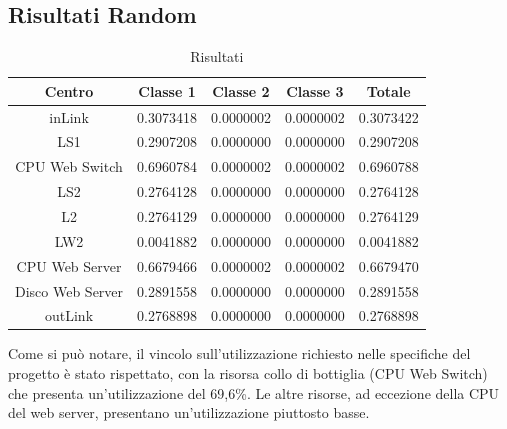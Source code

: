 \subsection{Risultati Random}
\begin{table}[H]
\begin{center}
\begin{tabular}{||c|c|c|c|c||}
\hline
Centro	&Classe 1	&Classe 2	&Classe 3	&Totale\\
\hline
\hline
inLink	&0.3073418		&0.0000002		&0.0000002		&0.3073422\\
\hline
LS1	&0.2907208		&0.0000000		&0.0000000		&0.2907208\\
\hline
CPU Web Switch	&0.6960784		&0.0000002		&0.0000002		&0.6960788\\
\hline
LS2	&0.2764128		&0.0000000		&0.0000000		&0.2764128\\
\hline
L2		&0.2764129		&0.0000000		&0.0000000		&0.2764129\\
\hline
LW2	&0.0041882		&0.0000000		&0.0000000		&0.0041882\\
\hline
CPU Web Server	&0.6679466		&0.0000002		&0.0000002		&0.6679470\\
\hline
Disco Web Server	&0.2891558		&0.0000000		&0.0000000		&0.2891558\\
\hline
outLink		&0.2768898		&0.0000000		&0.0000000		&0.2768898\\
\hline
\end{tabular}
\end{center}
\caption{Risultati}
\label{risrandom}
\end{table}
Come si può notare, il vincolo sull'utilizzazione richiesto nelle specifiche del progetto è stato rispettato, con la risorsa collo di bottiglia (CPU Web Switch) che presenta un'utilizzazione del 69,6\%. Le altre risorse, ad eccezione della CPU del web server, presentano un'utilizzazione piuttosto basse.

